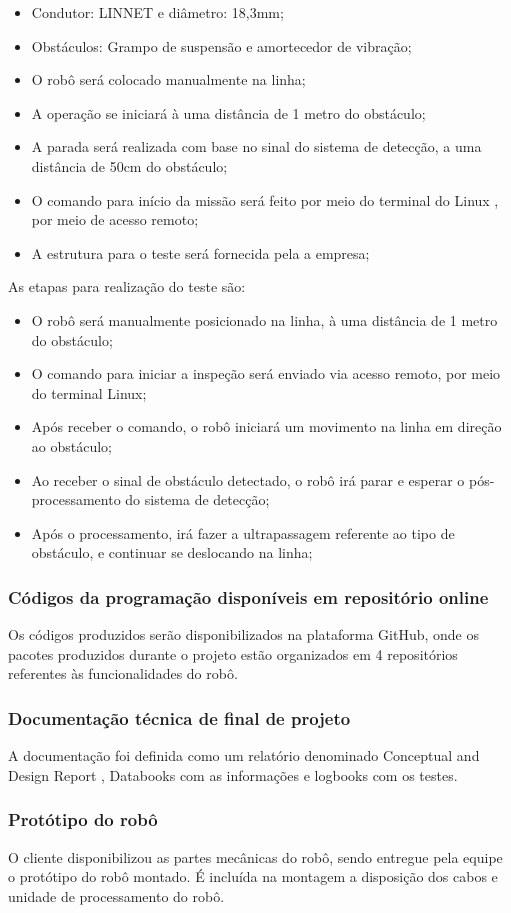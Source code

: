 \begin{itemize}

\item Condutor: LINNET e diâmetro: 18,3mm;
\item Obstáculos: Grampo de suspensão e amortecedor de vibração;
\item O robô será colocado manualmente na linha;
\item A operação se iniciará à uma distância de 1 metro do obstáculo;
\item A parada será realizada com base no sinal do sistema de detecção, a uma distância de 50cm do obstáculo;
\item O comando para início da missão será feito por meio do terminal do Linux , por meio de acesso remoto;
\item A estrutura para o teste será fornecida pela a empresa;

\end{itemize}

As etapas para realização do teste são:

\begin{itemize}
\item O robô será manualmente posicionado na linha, à uma distância de 1 metro do obstáculo;
\item O comando para iniciar a inspeção será enviado via acesso remoto, por meio do terminal Linux;
\item Após receber o comando, o robô iniciará um movimento na linha em direção ao obstáculo;
\item Ao receber o sinal de obstáculo detectado, o robô irá parar e esperar o pós-processamento do sistema de detecção;
\item Após o processamento, irá fazer a ultrapassagem referente ao tipo de obstáculo, e continuar se deslocando na linha;

\end{itemize}

\subsubsection{Códigos da programação disponíveis em repositório online}
Os códigos produzidos serão disponibilizados na plataforma GitHub, onde os pacotes produzidos durante o projeto estão organizados em 4 repositórios referentes às funcionalidades do robô.

\subsubsection{ Documentação técnica de final de projeto}
A documentação foi definida como um relatório denominado Conceptual and Design Report , Databooks com as informações e logbooks com os testes.

\subsubsection{Protótipo do robô}
O cliente disponibilizou as partes mecânicas do robô, sendo entregue pela equipe o protótipo do robô montado. É incluída na montagem a disposição dos cabos e unidade de processamento do robô.

